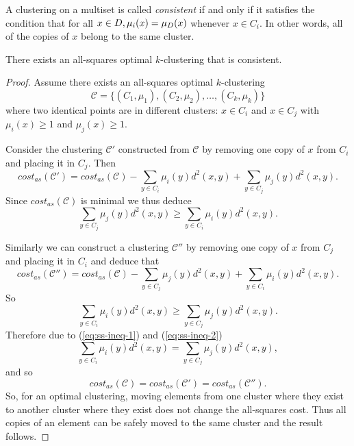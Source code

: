 \begin{dfn}
  \label{dfn:consistency}
  A clustering on a multiset is called \textit{consistent} if and only if it
  satisfies the condition that for all $x \in D, \mu_i(x) =
  \mu_{D}(x)$ whenever $x \in C_i$.  In other words, all of the copies of
  $x$ belong to the same cluster.
\end{dfn}

\begin{thm}
  There exists an all-squares optimal $k$-clustering that is consistent.
\end{thm}

\begin{proof}
  Assume there exists an all-squares optimal $k$-clustering
  \begin{equation*}
    \mathcal{C} = \{(C_1,\mu_1),(C_2,\mu_2),\dotsc,(C_k,\mu_k)\}
  \end{equation*}
  where two identical points are in different clusters: $x \in C_{i}$ and $x
  \in C_{j}$ with $\mu_i(x) \geq 1$ and $\mu_j(x) \geq 1$.

  Consider the clustering $\mathcal{C}'$ constructed from $\mathcal{C}$ by
  removing one copy of $x$ from $C_{i}$ and placing it in $C_{j}$.  Then
  \begin{equation*}
    cost_{as}(\mathcal{C}') = cost_{as}(\mathcal{C})
    - \sum_{y \in C_{i}} \mu_{i}(y) d^2(x,y)
    + \sum_{y \in C_{j}} \mu_{j}(y) d^2(x,y).
  \end{equation*}
  Since $cost_{as}(\mathcal{C})$ is minimal we thus deduce
  \begin{equation}
    \label{eq:ss-ineq-1}
    \sum_{y \in C_{j}} \mu_{j}(y) d^2(x,y) \geq
    \sum_{y \in C_{i}} \mu_{i}(y) d^2(x,y).
  \end{equation}

  Similarly we can construct a clustering $\mathcal{C}''$ by removing one copy
  of $x$ from $C_{j}$ and placing it in $C_{i}$ and deduce that
  \begin{equation*}
    cost_{as}(\mathcal{C}'') = cost_{as}(\mathcal{C})
    - \sum_{y \in C_{j}} \mu_{j}(y) d^2(x,y)
    + \sum_{y \in C_{i}} \mu_{i}(y) d^2(x,y).
  \end{equation*}
  So
  \begin{equation}
    \label{eq:ss-ineq-2}
    \sum_{y \in C_{i}} \mu_{i}(y) d^2(x,y) \geq
    \sum_{y \in C_{j}} \mu_{j}(y) d^2(x,y).
  \end{equation}
  Therefore due to (\ref{eq:ss-ineq-1}) and (\ref{eq:ss-ineq-2})
  \begin{equation*}
    \sum_{y \in C_{i}} \mu_{i}(y) d^2(x,y) =
    \sum_{y \in C_{j}} \mu_{j}(y) d^2(x,y),
  \end{equation*}
  and so
  \begin{equation*}
    cost_{as}(\mathcal{C}) = cost_{as}(\mathcal{C}') = cost_{as}(\mathcal{C}'').
  \end{equation*}
  So, for an optimal clustering, moving elements from one cluster where they
  exist to another cluster where they exist does not change the all-squares
  cost.  Thus all copies of an element can be safely moved to the same cluster
  and the result follows.
\end{proof}

